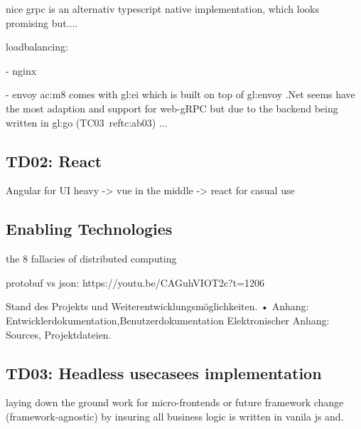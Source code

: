 nice grpc is an alternativ typescript native implementation, which looks promising but....

loadbalancing:

- nginx

- envoy
\gls{ac:m8} comes with \gls{gl:ei} which is built on top of \gls{gl:envoy}
.Net seems have the most adaption and support for web-gRPC but due to the backend being written in \gls{gl:go} (TC03~ref{tc:ab03}) ...

\subsection{TD02: React}

Angular for UI heavy -> vue in the middle -> react for casual use

\subsection{Enabling Technologies}

the 8 fallacies of distributed computing

protobuf vs json: https://youtu.be/CAGuhVIOT2c?t=1206

Stand des Projekts und Weiterentwicklungsmöglichkeiten.
• Anhang: Entwicklerdokumentation,Benutzerdokumentation
Elektronischer Anhang: Sources, Projektdateien.

\subsection{TD03: Headless usecasees implementation}

laying down the ground work for micro-frontends or future framework change (framework-agnostic) by insuring all business logic is written in vanila js and. 

